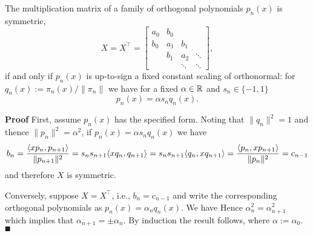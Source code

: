\begin{corollary} The multiplication matrix of a family of orthogonal polynomials $p_n(x)$ is symmetric,
\[
X = X^\ensuremath{\top} = \begin{bmatrix} a_0 & b_0 \\
                                                        b_0 & a_1 & b_1\\
                                                        & b_1 & a_2 & \ensuremath{\ddots} \\
                                                        && \ensuremath{\ddots} & \ensuremath{\ddots}
                                                        \end{bmatrix},
\]
if and only if $p_n(x)$ is up-to-sign a fixed constant scaling of orthonormal: for $q_n(x) := \ensuremath{\pi}_n(x)/\|\ensuremath{\pi}_n\|$ we have for a fixed $\alpha \in {\mathbb R}$ and $s_n \ensuremath{\in} \{-1,1\}$
\[
p_n(x) = \ensuremath{\alpha} s_n q_n(x).
\]
\end{corollary}
\textbf{Proof} First, assume $p_n(x)$ has the specified form. Noting that $\|q_n\|^2 = 1$ and thence $\|p_n\|^2 = \ensuremath{\alpha}^2$, if $p_n(x) = \ensuremath{\alpha} s_n q_n(x)$ we have
\[
b_n = {\ensuremath{\langle}xp_n, p_{n+1}\ensuremath{\rangle} \over \|p_{n+1}\|^2} = s_n s_{n+1} \ensuremath{\langle}x q_n, q_{n+1}\ensuremath{\rangle} =
s_n s_{n+1} \ensuremath{\langle}q_n, x q_{n+1}\ensuremath{\rangle} = {\ensuremath{\langle}p_n, xp_{n+1}\ensuremath{\rangle} \over \|p_n\|^2} = c_{n-1}
\]
and therefore $X$ is symmetric.

Conversely, suppose $X = X^\ensuremath{\top}$, i.e., $b_n = c_{n-1}$ and write the corresponding orthogonal polynomials as $p_n(x) = \ensuremath{\alpha}_n q_n(x)$. We have
Hence $\ensuremath{\alpha}_n^2 = \ensuremath{\alpha}_{n+1}^2$ which implies that $\ensuremath{\alpha}_{n+1} = \ensuremath{\pm} \ensuremath{\alpha}_n$. By induction the result follows, where $\ensuremath{\alpha} := \ensuremath{\alpha}_0$. \ensuremath{\QED}

